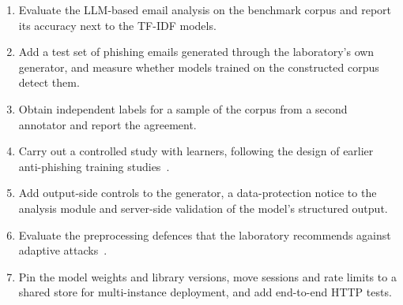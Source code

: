 \begin{enumerate}
\item Evaluate the LLM-based email analysis on the benchmark corpus and report its accuracy next to the TF-IDF models.
\item Add a test set of phishing emails generated through the laboratory's own generator, and measure whether models trained on the constructed corpus detect them.
\item Obtain independent labels for a sample of the corpus from a second annotator and report the agreement.
\item Carry out a controlled study with learners, following the design of earlier anti-phishing training studies~\cite{sheng2007phil}.
\item Add output-side controls to the generator, a data-protection notice to the analysis module and server-side validation of the model's structured output.
\item Evaluate the preprocessing defences that the laboratory recommends against adaptive attacks~\cite{guo2018countering,athalye2018obfuscated}.
\item Pin the model weights and library versions, move sessions and rate limits to a shared store for multi-instance deployment, and add end-to-end HTTP tests.
\end{enumerate}
